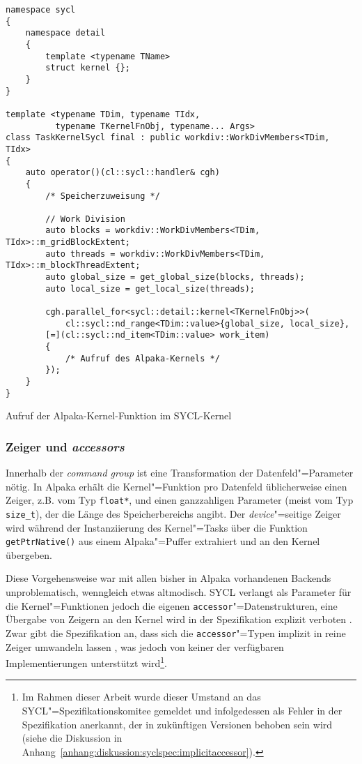 \begin{code}
    \begin{verbatim}
namespace sycl
{
    namespace detail
    {
        template <typename TName>
        struct kernel {};
    }
}

template <typename TDim, typename TIdx,
          typename TKernelFnObj, typename... Args>
class TaskKernelSycl final : public workdiv::WorkDivMembers<TDim, TIdx>
{
    auto operator()(cl::sycl::handler& cgh)
    {
        /* Speicherzuweisung */

        // Work Division
        auto blocks = workdiv::WorkDivMembers<TDim, TIdx>::m_gridBlockExtent;
        auto threads = workdiv::WorkDivMembers<TDim, TIdx>::m_blockThreadExtent;
        auto global_size = get_global_size(blocks, threads);
        auto local_size = get_local_size(threads);

        cgh.parallel_for<sycl::detail::kernel<TKernelFnObj>>(
            cl::sycl::nd_range<TDim::value>{global_size, local_size},
        [=](cl::sycl::nd_item<TDim::value> work_item)
        {
            /* Aufruf des Alpaka-Kernels */
        });
    }
}
    \end{verbatim}
    \caption{Aufruf der Alpaka-Kernel-Funktion im SYCL-Kernel}
    \label{implementierung:task:kernel:launch}
\end{code}

\subsubsection{Zeiger und \textit{accessors}}

Innerhalb der \textit{command group} ist eine Transformation der
Datenfeld"=Parameter nötig. In Alpaka erhält die Kernel"=Funktion pro Datenfeld
üblicherweise einen Zeiger, z.B. vom Typ \texttt{float*}, und einen ganzzahligen
Parameter (meist vom Typ \texttt{size\_t}), der die Länge des Speicherbereichs
angibt. Der \textit{device}"=seitige Zeiger wird während der Instanziierung des
Kernel"=Tasks über die Funktion \texttt{getPtrNative()} aus einem Alpaka"=Puffer
extrahiert und an den Kernel übergeben.

Diese Vorgehensweise war mit allen bisher in Alpaka vorhandenen Backends
unproblematisch, wenngleich etwas altmodisch. SYCL verlangt als Parameter für
die Kernel"=Funktionen jedoch die eigenen \texttt{accessor}"=Datenstrukturen,
eine Übergabe von Zeigern an den Kernel wird in der Spezifikation explizit
verboten \cite[vgl.][192]{sycl2019}. Zwar gibt die Spezifikation an, dass sich
die \texttt{accessor}"=Typen implizit in reine Zeiger umwandeln lassen
\cite[vgl.][27]{sycl2019}, was jedoch von keiner der verfügbaren
Implementierungen unterstützt wird\footnote{Im Rahmen dieser Arbeit wurde dieser
Umstand an das SYCL"=Spezifikationskomitee gemeldet und infolgedessen als Fehler
in der Spezifikation anerkannt, der in zukünftigen Versionen behoben sein wird
(siehe die Diskussion in
Anhang~\ref{anhang:diskussion:syclspec:implicitaccessor}).}.

